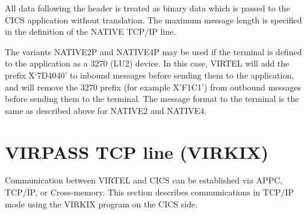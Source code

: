 \documentclass[letterpaper,10pt,english]{sphinxmanual}
\begin{document}

All data following the header is treated as binary data which is passed to the CICS application without translation. The maximum message length is specified in the definition of the NATIVE TCP/IP line.

The variants NATIVE2P and NATIVE4P may be used if the terminal is defined to the application as a 3270 (LU2) device. In this case, VIRTEL will add the prefix X‘7D4040’ to inbound messages before sending them to the application, and will remove the 3270 prefix (for example X’F1C1’) from outbound messages before sending them to the terminal. The message format to the terminal is the same as described above for NATIVE2 and NATIVE4.

\newpage


\section{VIRPASS TCP line (VIRKIX)}
\label{\detokenize{connectivity_guide:virpass-tcp-line-virkix}}\label{\detokenize{connectivity_guide:index-42}}
Communication between VIRTEL and CICS can be established via APPC, TCP/IP, or Cross-memory. This section describes communications in TCP/IP mode using the VIRKIX program on the CICS side.


\end{document}
